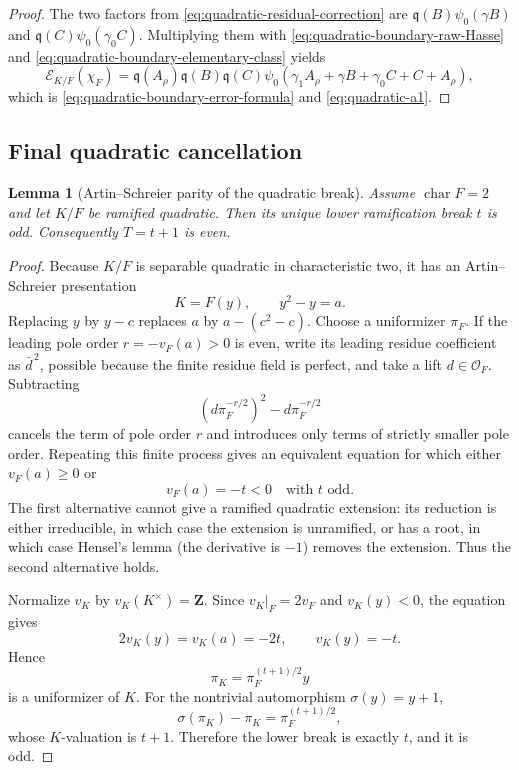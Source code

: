 \documentclass[11pt]{amsart}
\newtheorem{lemma}[theorem]{Lemma}
\theoremstyle{definition}
\theoremstyle{remark}
\newcommand{\cO}{\mathcal O}
\newcommand{\Err}{\mathcal E}
\begin{document}
\begin{proof}
The two factors from \eqref{eq:quadratic-residual-correction} are
$\mathfrak q(B)\psi_0(\gamma B)$ and
$\mathfrak q(C)\psi_0(\gamma_0C)$.  Multiplying them with
\eqref{eq:quadratic-boundary-raw-Hasse} and
\eqref{eq:quadratic-boundary-elementary-class} yields
\[
 \Err_{K/F}(\chi_F)
 =\mathfrak q(A_\rho)\mathfrak q(B)\mathfrak q(C)
  \psi_0(\gamma_1A_\rho+\gamma B+\gamma_0C+C+A_\rho),
\]
which is \eqref{eq:quadratic-boundary-error-formula} and
\eqref{eq:quadratic-a1}.
\end{proof}

\subsection{Final quadratic cancellation}

\begin{lemma}[Artin--Schreier parity of the quadratic break]
\label{lem:AS-break-parity}
Assume $\operatorname{char}F=2$ and let $K/F$ be ramified quadratic.
Then its unique lower ramification break $t$ is odd.  Consequently
$T=t+1$ is even.
\end{lemma}

\begin{proof}
Because $K/F$ is separable quadratic in characteristic two, it has an
Artin--Schreier presentation
\[
 K=F(y),\qquad y^2-y=a.
\]
Replacing $y$ by $y-c$ replaces $a$ by $a-(c^2-c)$.  Choose a
uniformizer $\pi_F$.  If the leading pole order
$r=-v_F(a)>0$ is even, write its leading residue coefficient as
$\bar d^{\,2}$, possible because the finite residue field is perfect,
and take a lift $d\in\cO_F$.  Subtracting
\[
 (d\pi_F^{-r/2})^2-d\pi_F^{-r/2}
\]
cancels the term of pole order $r$ and introduces only terms of
strictly smaller pole order.  Repeating this finite process gives an
equivalent equation for which either $v_F(a)\ge0$ or
\[
 v_F(a)=-t<0\quad\text{with }t\text{ odd}.
\]
The first alternative cannot give a ramified quadratic extension: its
reduction is either irreducible, in which case the extension is
unramified, or has a root, in which case Hensel's lemma (the derivative
is $-1$) removes the extension.  Thus the second alternative holds.

Normalize $v_K$ by $v_K(K^\times)=\mathbf Z$.  Since
$v_K|_F=2v_F$ and $v_K(y)<0$, the equation gives
\[
 2v_K(y)=v_K(a)=-2t,
 \qquad v_K(y)=-t.
\]
Hence
\[
 \pi_K=\pi_F^{(t+1)/2}y
\]
is a uniformizer of $K$.  For the nontrivial automorphism
$\sigma(y)=y+1$,
\[
 \sigma(\pi_K)-\pi_K=\pi_F^{(t+1)/2},
\]
whose $K$-valuation is $t+1$.  Therefore the lower break is exactly
$t$, and it is odd.
\end{proof}
\end{document}
